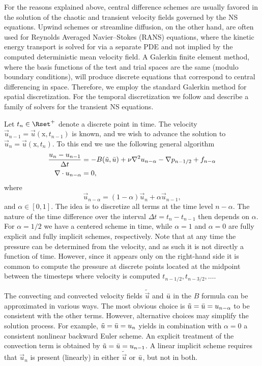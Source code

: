 For the reasons explained above, central difference schemes are usually
favored in the solution of the chaotic and transient velocity fields
governed by the NS equations. Upwind schemes or streamline diffusion,
on the other hand, are often used for Reynolds Averaged Navier--Stokes
(RANS) equations, where the kinetic energy transport is solved for
via a separate PDE and not implied by the computed deterministic mean
velocity field. A Galerkin finite element method, where the basis
functions of the test and trial spaces are the same (modulo boundary
conditions), will produce discrete equations that correspond to central
differencing in space. Therefore, we employ the standard Galerkin method
for spatial discretization. For the temporal discretization we follow
\citet{SimoArmero1994} and describe a family of solvers for the transient
NS equations.

Let $t_n \in \Rset^{+}$ denote a discrete point in time. The velocity
$\vec{u}_{n-1}=\vec{u}(\text{x},t_{n-1})$ is known, and we wish to advance
the solution to $\vec{u}_{n}=\vec{u}(\text{x},t_{n})$.  To this end we
use the following general algorithm
\begin{align}
\label{eq:mortensen:NS_d}
    \frac{\vec{u}_{n}-\vec{u}_{n-1}}{\Delta t}
      &= - B(\tilde{\vec{u}},\Bar{\vec{u}})
          + \nu \nabla^2 \vec{u}_{n-\alpha}
        -\nabla p_{n-1/2} + f_{n-\alpha}
\\
 \label{eq:mortensen:cont_d}
    \nabla \cdot \vec{u}_{n-\alpha} &= 0,
\end{align}
where
\begin{equation}
   \vec{u}_{n-\alpha}=(1-\alpha) \vec{u}_{n} + \alpha \vec{u}_{n-1},
\end{equation}
and $\alpha \in [0, 1]$.  The idea is to discretize all terms at the
time level $n-\alpha$. The nature of the time difference over the interval
$\Delta t = t_n - t_{n-1}$ then depends on $\alpha$. For $\alpha =1/2$
we have a centered scheme
in time, while $\alpha =1$ and $\alpha=0$ are fully explicit and fully
implicit schemes, respectively. Note that at any time the pressure can be
determined from the velocity, and as such it is not directly a function
of time. However, since it appears only on the right-hand side it is
common to compute the pressure at discrete points located at the
midpoint between the timesteps where velocity is computed
$t_{n-1/2}, t_{n-3/2}, \ldots$.

The convecting and convected velocity fields
$\tilde{\vec{u}}$ and $\Bar{\vec{u}}$ in the $B$ formula can
be approximated in various ways. The most obvious choice is
$\tilde{\vec{u}}=\Bar{\vec{u}}=\vec{u}_{n-\alpha}$ to be consistent with
the other terms. However, alternative choices may simplify the solution
process. For example, $\tilde{\vec{u}}=\Bar{\vec{u}}=\vec{u}_{n}$ yields
in combination with $\alpha=0$ a consistent nonlinear backward Euler
scheme. An explicit treatment of the convection term is obtained by
$\tilde{\vec{u}} = \Bar{\vec{u}} = \vec{u}_{n-1}$.  A linear implicit
scheme requires that $\vec{u}_{n}$ is present (linearly) in either
$\tilde{\vec{u}}$ or $\Bar{\vec{u}}$, but not in both.

